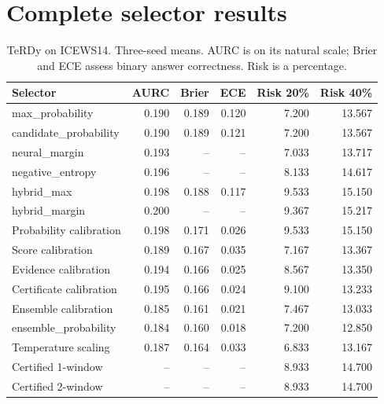 \clearpage\section{Complete selector results}
\begin{table}[H]\centering\small\caption{TeRDy on ICEWS14. Three-seed means. AURC is on its natural scale; Brier and ECE assess binary answer correctness. Risk is a percentage.}\begin{tabular}{lrrrrr}\toprule Selector & AURC & Brier & ECE & Risk 20\% & Risk 40\%\\\midrule
max\_probability & 0.190 & 0.189 & 0.120 & 7.200 & 13.567\\
candidate\_probability & 0.190 & 0.189 & 0.121 & 7.200 & 13.567\\
neural\_margin & 0.193 & -- & -- & 7.033 & 13.717\\
negative\_entropy & 0.196 & -- & -- & 8.133 & 14.617\\
hybrid\_max & 0.198 & 0.188 & 0.117 & 9.533 & 15.150\\
hybrid\_margin & 0.200 & -- & -- & 9.367 & 15.217\\
Probability calibration & 0.198 & 0.171 & 0.026 & 9.533 & 15.150\\
Score calibration & 0.189 & 0.167 & 0.035 & 7.167 & 13.367\\
Evidence calibration & 0.194 & 0.166 & 0.025 & 8.567 & 13.350\\
Certificate calibration & 0.195 & 0.166 & 0.024 & 9.100 & 13.233\\
Ensemble calibration & 0.185 & 0.161 & 0.021 & 7.467 & 13.033\\
ensemble\_probability & 0.184 & 0.160 & 0.018 & 7.200 & 12.850\\
Temperature scaling & 0.187 & 0.164 & 0.033 & 6.833 & 13.167\\
Certified 1-window & -- & -- & -- & 8.933 & 14.700\\
Certified 2-window & -- & -- & -- & 8.933 & 14.700\\
\bottomrule\end{tabular}\end{table}
